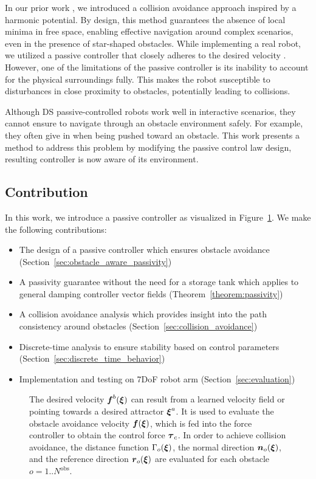 In our prior work \cite{huber2019avoidance, huber2023avoidance}, we introduced a collision avoidance approach inspired by a harmonic potential. By design, this method guarantees the absence of local minima in free space, enabling effective navigation around complex scenarios, even in the presence of star-shaped obstacles.
While implementing a real robot, we utilized a passive controller that closely adheres to the desired velocity \cite{kronander2015passive}. However, one of the limitations of the passive controller is its inability to account for the physical surroundings fully. This makes the robot susceptible to disturbances in close proximity to obstacles, potentially leading to collisions.

Although DS passive-controlled robots work well in interactive scenarios, they cannot ensure to navigate through an obstacle environment safely. For example, they often give in when being pushed toward an obstacle. This work presents a method to address this problem by modifying the passive control law design, resulting controller is now aware of its environment.

\subsection{Contribution}
In this work, we introduce a passive controller as visualized in Figure~\ref{fig:control_scheme_passive}. We make the following contributions:

\begin{itemize}
\item The design of a passive controller which ensures obstacle avoidance (Section~\ref{sec:obstacle_aware_passivity})
\item A passivity guarantee without the need for a storage tank which applies to general damping controller vector fields (Theorem~\ref{theorem:passivity})
\item A collision avoidance analysis which provides insight into the path consistency around obstacles (Section~\ref{sec:collision_avoidance})
\item Discrete-time analysis to ensure stability based on control parameters (Section~\ref{sec:discrete_time_behavior})
\item Implementation and testing on 7DoF robot arm (Section~\ref{sec:evaluation})
\end{itemize}

\begin{figure}[thb]
  \center
  
\caption{The desired velocity $\boldsymbol{f}^b(\boldsymbol{\xi})$ can result from a learned velocity field or pointing towards a desired attractor $\boldsymbol{\xi}^a$. It is used to evaluate the obstacle avoidance velocity $\boldsymbol{f}(\boldsymbol{\xi})$, which is fed into the force controller to obtain the control force $\boldsymbol{\tau}_c$. In order to achieve collision avoidance, the distance function $\Gamma_o(\boldsymbol{\xi})$, the normal direction $\boldsymbol{n}_o(\boldsymbol{\xi})$, and the reference direction $\boldsymbol{r}_o(\boldsymbol{\xi})$ are evaluated for each obstacle $o = 1 .. N^\mathrm{{obs}}$.}
\label{fig:control_scheme_passive}
\end{figure}
